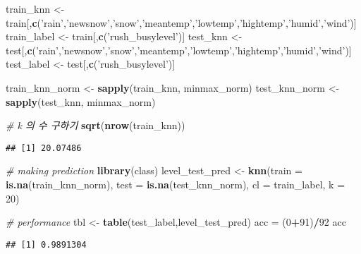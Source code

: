 \documentclass[]{article}
\newenvironment{Shaded}{\begin{snugshade}}{\end{snugshade}}
\newcommand{\KeywordTok}[1]{\textcolor[rgb]{0.13,0.29,0.53}{\textbf{#1}}}
\newcommand{\DataTypeTok}[1]{\textcolor[rgb]{0.13,0.29,0.53}{#1}}
\newcommand{\DecValTok}[1]{\textcolor[rgb]{0.00,0.00,0.81}{#1}}
\newcommand{\StringTok}[1]{\textcolor[rgb]{0.31,0.60,0.02}{#1}}
\newcommand{\CommentTok}[1]{\textcolor[rgb]{0.56,0.35,0.01}{\textit{#1}}}
\newcommand{\OperatorTok}[1]{\textcolor[rgb]{0.81,0.36,0.00}{\textbf{#1}}}
\newcommand{\NormalTok}[1]{#1}
\begin{document}
\begin{Shaded}
\begin{Highlighting}[]
\NormalTok{train_knn <-}\StringTok{  }\NormalTok{train[,}\KeywordTok{c}\NormalTok{(}\StringTok{'rain'}\NormalTok{,}\StringTok{'newsnow'}\NormalTok{,}\StringTok{'snow'}\NormalTok{,}\StringTok{'meantemp'}\NormalTok{,}\StringTok{'lowtemp'}\NormalTok{,}\StringTok{'hightemp'}\NormalTok{,}\StringTok{'humid'}\NormalTok{,}\StringTok{'wind'}\NormalTok{)]}
\NormalTok{train_label <-}\StringTok{ }\NormalTok{train[,}\KeywordTok{c}\NormalTok{(}\StringTok{'rush_busylevel'}\NormalTok{)]}
\NormalTok{test_knn <-}\StringTok{  }\NormalTok{test[,}\KeywordTok{c}\NormalTok{(}\StringTok{'rain'}\NormalTok{,}\StringTok{'newsnow'}\NormalTok{,}\StringTok{'snow'}\NormalTok{,}\StringTok{'meantemp'}\NormalTok{,}\StringTok{'lowtemp'}\NormalTok{,}\StringTok{'hightemp'}\NormalTok{,}\StringTok{'humid'}\NormalTok{,}\StringTok{'wind'}\NormalTok{)]}
\NormalTok{test_label <-}\StringTok{ }\NormalTok{test[,}\KeywordTok{c}\NormalTok{(}\StringTok{'rush_busylevel'}\NormalTok{)]}


\NormalTok{train_knn_norm <-}\StringTok{ }\KeywordTok{sapply}\NormalTok{(train_knn, minmax_norm)}
\NormalTok{test_knn_norm <-}\StringTok{ }\KeywordTok{sapply}\NormalTok{(test_knn, minmax_norm)}

\CommentTok{# k 의 수 구하기}
\KeywordTok{sqrt}\NormalTok{(}\KeywordTok{nrow}\NormalTok{(train_knn))}
\end{Highlighting}
\end{Shaded}

\begin{verbatim}
## [1] 20.07486
\end{verbatim}

\begin{Shaded}
\begin{Highlighting}[]
\CommentTok{# making prediction}
\KeywordTok{library}\NormalTok{(class)}
\NormalTok{level_test_pred <-}\StringTok{ }\KeywordTok{knn}\NormalTok{(}\DataTypeTok{train =} \KeywordTok{is.na}\NormalTok{(train_knn_norm), }\DataTypeTok{test =} \KeywordTok{is.na}\NormalTok{(test_knn_norm), }\DataTypeTok{cl =}\NormalTok{ train_label,}
                       \DataTypeTok{k =} \DecValTok{20}\NormalTok{)}

\CommentTok{# performance}
\NormalTok{  tbl <-}\StringTok{ }\KeywordTok{table}\NormalTok{(test_label,level_test_pred)}
\NormalTok{  acc =}\StringTok{  }\NormalTok{(}\DecValTok{0}\OperatorTok{+}\DecValTok{91}\NormalTok{)}\OperatorTok{/}\DecValTok{92}
\NormalTok{  acc}
\end{Highlighting}
\end{Shaded}

\begin{verbatim}
## [1] 0.9891304
\end{verbatim}
\end{document}

